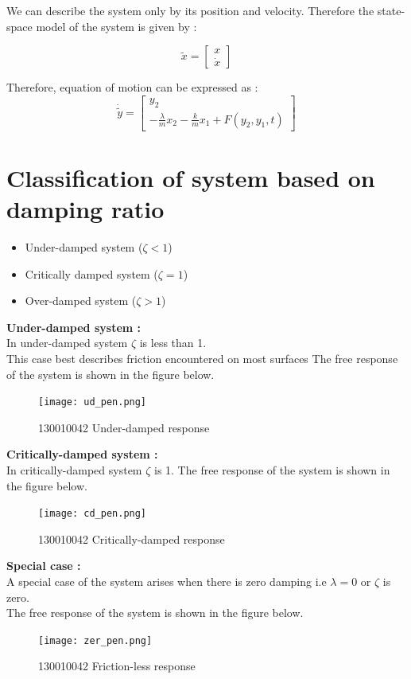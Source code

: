 \documentclass[11pt]{article}
\begin{document}
We can describe the system only by its position and velocity. Therefore the state-space model
of the system is given by :

\[
\widetilde{x}=
\begin{bmatrix}
x \\
\dot{x}
\end{bmatrix}
\]

Therefore, equation of motion can be expressed as :
\[
\dot{\widetilde{y}}=
\begin{bmatrix}
y_2\\
- \frac{\lambda}{m}x_2 - \frac{k}{m}x_1 + F(y_2,y_1,t)
\end{bmatrix}
\]
\hfill \break
\section{Classification of system based on damping ratio}
\begin{itemize}
	\item{Under-damped system ($\zeta < 1$)}
	\item{Critically damped system ($\zeta = 1$)}
	\item{Over-damped system ($\zeta > 1$)}
\end{itemize}

\newpage
\noindent\textbf{Under-damped system :} \\
In under-damped system $\zeta$ is less than 1. \\
This case best describes friction encountered on most surfaces
The free response of the system is shown in the figure below.
\begin{figure}[H]
\centering
\texttt{[image: ud\_pen.png]}
\caption{130010042 Under-damped response}
\label{Fig2}
\end{figure}

\newpage
\noindent\textbf{Critically-damped system :} \\
In critically-damped system $\zeta$ is 1.
The free response of the system is shown in the figure below.

\begin{figure}[H]
\centering
\texttt{[image: cd\_pen.png]}
\caption{130010042 Critically-damped response}
\label{Fig3}
\end{figure}

\newpage
\noindent\textbf{Special case :} \\
A special case of the system arises when there is zero damping i.e $\lambda = 0$ or $\zeta$ is zero. \\
The free response of the system is shown in the figure below.

\begin{figure}[H]
\centering
\texttt{[image: zer\_pen.png]}
\caption{130010042 Friction-less response}
\label{Fig4}
\end{figure}


{}

\end{document}
